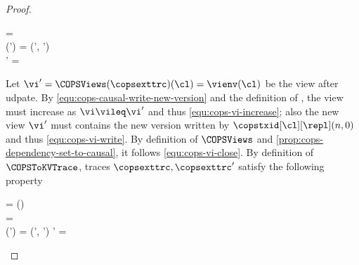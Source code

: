 \begin{proof}
\begin{enumerate}
\begin{enumerate}
\begin{Formulae}
\begin{Formula}
\begin{multlined}
            \land \copsexttrc = 
            \\ {} \land \LastConf(\copsexttrc') = (\cops', \copsctxenv')
            \\ {} \land \copsctxenv' = \copsctxenv{}
        \end{multlined}
        \label{equ:cops-causal-write-new-version}
        \end{Formula}
        \end{Formulae}
        Let \( \vi' = \COPSViews(\copsexttrc)(\cl) = \vienv(\cl) \) be the view after udpate.
        By \cref{equ:cops-causal-write-new-version} and the definition of \COPSViews, 
        the view must increase as \(\vi \vileq \vi' \) and thus \cref{equ:cops-vi-increase};
        also the new view \( \vi' \) must contains the new version written by \(\copstxid[\cl][\repl](n,0) \)
        and thus \cref{equ:cops-vi-write}.
        By definition of \( \COPSViews\) and \cref{prop:cops-dependency-set-to-causal}, 
        it follows \cref{equ:cops-vi-close}.
        By definition of \( \COPSToKVTrace \), traces \( \copsexttrc, \copsexttrc' \) satisfy the following property
        \begin{Formulae}
        \begin{Formula}
        \begin{multlined}
            \vi = \vienv(\cl) 
            \\ {} \land \copsexttrc =  
            \\ {} \land \LastConf(\copsexttrc') = (\cops', \copsctxenv')
            \land \copsctxenv' = \copsctxenv{}
        \end{multlined}
        \label{equ:cops-causal-read-versions}
        \end{Formula}
        \end{Formulae}

\end{enumerate}
\end{enumerate}
\end{proof}
